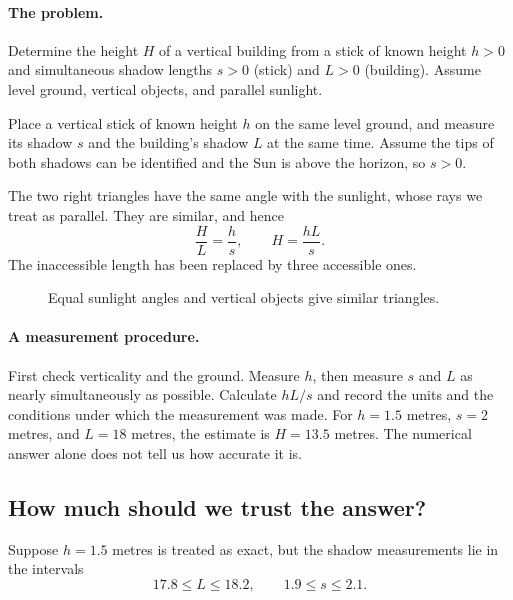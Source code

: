 \paragraph{The problem.}
Determine the height $H$ of a vertical building from a stick of known
height $h>0$ and simultaneous shadow lengths $s>0$ (stick) and $L>0$
(building). Assume level ground, vertical objects, and parallel sunlight.

Place a vertical stick
of known height $h$ on the same level ground, and measure its shadow $s$
and the building's shadow $L$ at the same time. Assume the tips of both
shadows can be identified and the Sun is above the horizon, so $s>0$.

The two right triangles have the same angle with the sunlight, whose rays
we treat as parallel. They are similar, and hence
\[
\frac{H}{L}=\frac{h}{s},\qquad H=\frac{hL}{s}.
\]
The inaccessible length has been replaced by three accessible ones.

\begin{figure}[htbp]\centering
{}
\caption{Equal sunlight angles and vertical objects give similar triangles.}
\label{fig:geo-shadows}
\end{figure}

\paragraph{A measurement procedure.}
First check verticality and the ground. Measure $h$, then measure $s$ and
$L$ as nearly simultaneously as possible. Calculate $hL/s$ and record the
units and the conditions under which the measurement was made.
For $h=1.5$ metres, $s=2$ metres, and $L=18$ metres, the estimate is
$H=13.5$ metres. The numerical answer alone does not tell us how accurate
it is.

\subsection{How much should we trust the answer?}
Suppose $h=1.5$ metres is treated as exact, but the shadow measurements
lie in the intervals
\[
17.8\leq L\leq18.2,\qquad1.9\leq s\leq2.1.
\]
